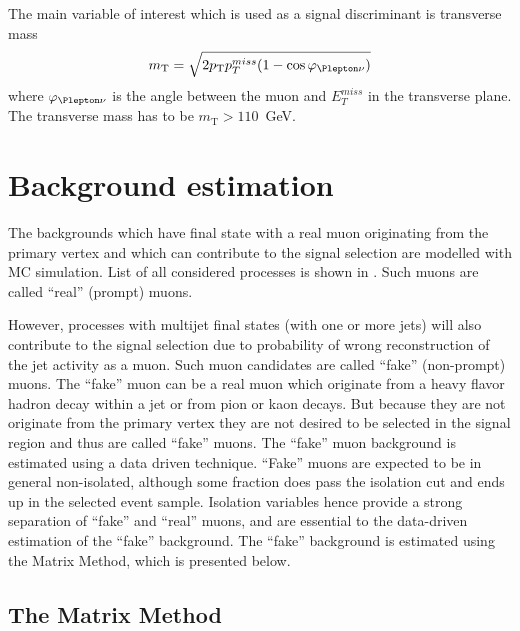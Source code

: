
The main variable of interest which is used as a signal discriminant is transverse mass
\begin{equation}
 m_\mathrm{T} = \sqrt{2 p_\mathrm{T} p_T^{miss} (1-\cos\varphi_{\Plepton\nu})}
\end{equation}
where $\varphi_{\Plepton\nu}$ is the angle between the muon and $E_T^{miss}$ in the transverse plane.
The transverse mass has to be $m_\mathrm{T} > 110$~GeV.

\section{Background estimation}
\label{sec:wprime_backgroundEstimation}

The backgrounds which have final state with a real muon originating from the primary vertex and 
which can contribute to the signal selection are modelled with MC simulation.
List of all considered processes is shown in .
Such muons are called ``real'' (prompt) muons.

However, processes with multijet final states (with one or more jets) will also contribute to
the signal selection due to probability of wrong reconstruction of the jet activity as a muon.
Such muon candidates are called ``fake'' (non-prompt) muons.
The ``fake'' muon can be a real muon which originate from a heavy flavor hadron decay within a jet
or from pion or kaon decays. But because they are not originate from the primary vertex they are not
desired to be selected in the signal region and thus are called ``fake'' muons.
The ``fake'' muon background is estimated using a data driven technique. 
``Fake'' muons are expected to be in general non-isolated, although some
fraction does pass the isolation cut and ends up in the selected event sample. Isolation variables
hence provide a strong separation of ``fake'' and ``real'' muons, and are essential to the data-driven
estimation of the ``fake'' background.
The ``fake'' background is estimated using the Matrix Method, which is presented below.

\subsection{The Matrix Method}
\label{subsec:matrix_method}

